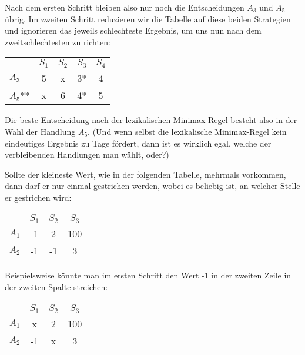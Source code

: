Nach dem ersten Schritt bleiben also nur noch die Entscheidungen $A_3$ und
$A_5$ übrig. Im zweiten Schritt reduzieren wir die Tabelle auf diese beiden
Strategien und ignorieren das jeweils schlechteste Ergebnis, um uns nun nach dem
zweitschlechtesten zu richten:

\begin{center}
\begin{tabular}{l|c|c|c|c|}
\multicolumn{1}{c}{ } & \multicolumn{1}{c}{$S_1$} &
\multicolumn{1}{c}{$S_2$} & \multicolumn{1}{c}{$S_3$} & 
\multicolumn{1}{c}{$S_4$} \\ \cline{2-5}
$A_3$   &    5  &    x &    3*  &   4   \\ \cline{2-5}
$A_5$** &    x  &   6  &    4*  &   5   \\ \cline{2-5}
\end{tabular}
\end{center}

Die beste Entscheidung nach der lexikalischen Minimax-Regel besteht
also in der Wahl der Handlung $A_5$. (Und wenn selbst die lexikalische
Minimax-Regel kein eindeutiges Ergebnis zu Tage fördert, dann ist es wirklich
egal, welche der verbleibenden Handlungen man wählt, oder?)

Sollte der kleineste Wert, wie in der folgenden Tabelle, mehrmals vorkommen,
dann darf er nur einmal gestrichen werden, wobei es beliebig ist, an welcher
Stelle er gestrichen wird:

\begin{center}
\begin{tabular}{l|c|c|c|}
\multicolumn{1}{c}{ } & \multicolumn{1}{c}{$S_1$} &
\multicolumn{1}{c}{$S_2$} & \multicolumn{1}{c}{$S_3$}
\\ \cline{2-4}
$A_1$   &    -1  &   2 &  100  \\ \cline{2-4}
$A_2$   &    -1  &  -1 &   3   \\ \cline{2-4}
\end{tabular}
\end{center}

Beispielsweise könnte man im ersten Schritt den Wert -1 in der zweiten Zeile
in der zweiten Spalte streichen:

\begin{center}
\begin{tabular}{l|c|c|c|}
\multicolumn{1}{c}{ } & \multicolumn{1}{c}{$S_1$} &
\multicolumn{1}{c}{$S_2$} & \multicolumn{1}{c}{$S_3$}
\\ \cline{2-4}
$A_1$   &    x  &  2  &  100  \\ \cline{2-4}
$A_2$   &    -1 &  x  &   3   \\ \cline{2-4}
\end{tabular}
\end{center}

